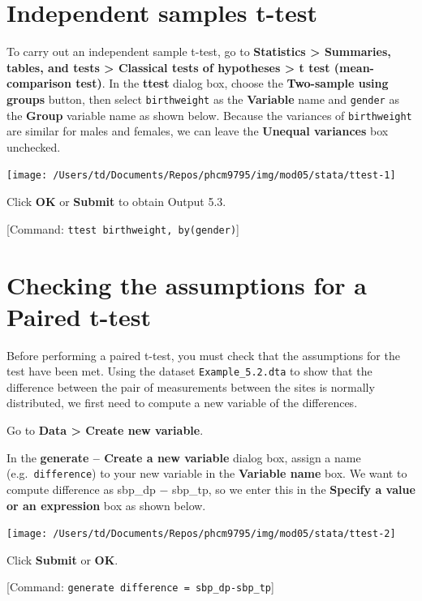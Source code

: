\documentclass[
]{memoir}
\begin{document}
\hypertarget{independent-samples-t-test-1}{%
\section{Independent samples t-test}\label{independent-samples-t-test-1}}

To carry out an independent sample t-test, go to \textbf{Statistics \textgreater{} Summaries, tables, and tests \textgreater{} Classical tests of hypotheses \textgreater{} t test (mean-comparison test)}. In the \textbf{ttest} dialog box, choose the \textbf{Two-sample using groups} button, then select \texttt{birthweight} as the \textbf{Variable} name and \texttt{gender} as the \textbf{Group} variable name as shown below. Because the variances of \texttt{birthweight} are similar for males and females, we can leave the \textbf{Unequal variances} box unchecked.

\texttt{[image: /Users/td/Documents/Repos/phcm9795/img/mod05/stata/ttest-1]}

Click \textbf{OK} or \textbf{Submit} to obtain Output 5.3.

{[}Command: \texttt{ttest\ birthweight,\ by(gender)}{]}

\hypertarget{checking-the-assumptions-for-a-paired-t-test}{%
\section{Checking the assumptions for a Paired t-test}\label{checking-the-assumptions-for-a-paired-t-test}}

Before performing a paired t-test, you must check that the assumptions for the test have been met. Using the dataset \texttt{Example\_5.2.dta} to show that the difference between the pair of measurements between the sites is normally distributed, we first need to compute a new variable of the differences.

Go to \textbf{Data \textgreater{} Create new variable}.

In the \textbf{generate -- Create a new variable} dialog box, assign a name (e.g.~\texttt{difference}) to your new variable in the \textbf{Variable name} box. We want to compute difference as sbp\_dp − sbp\_tp, so we enter this in the \textbf{Specify a value or an expression} box as shown below.

\texttt{[image: /Users/td/Documents/Repos/phcm9795/img/mod05/stata/ttest-2]}

Click \textbf{Submit} or \textbf{OK}.

{[}Command: \texttt{generate\ difference\ =\ sbp\_dp-sbp\_tp}{]}
\end{document}
